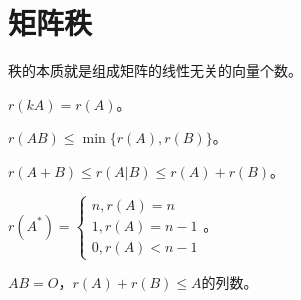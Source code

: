 \documentclass[UTF8, 12pt]{ctexart}
\begin{document}
\section{矩阵秩}

秩的本质就是组成矩阵的线性无关的向量个数。

$r(kA)=r(A)$。

$r(AB)\leqslant\min\{r(A),r(B)\}$。

$r(A+B)\leqslant r(A|B)\leqslant r(A)+r(B)$。

$r(A^*)=\left\{\begin{array}{l}
    n, r(A)=n \\
    1, r(A)=n-1 \\
    0, r(A)<n-1
\end{array}\right.$。

$AB=O$，$r(A)+r(B)\leqslant A$的列数。


\end{document}

